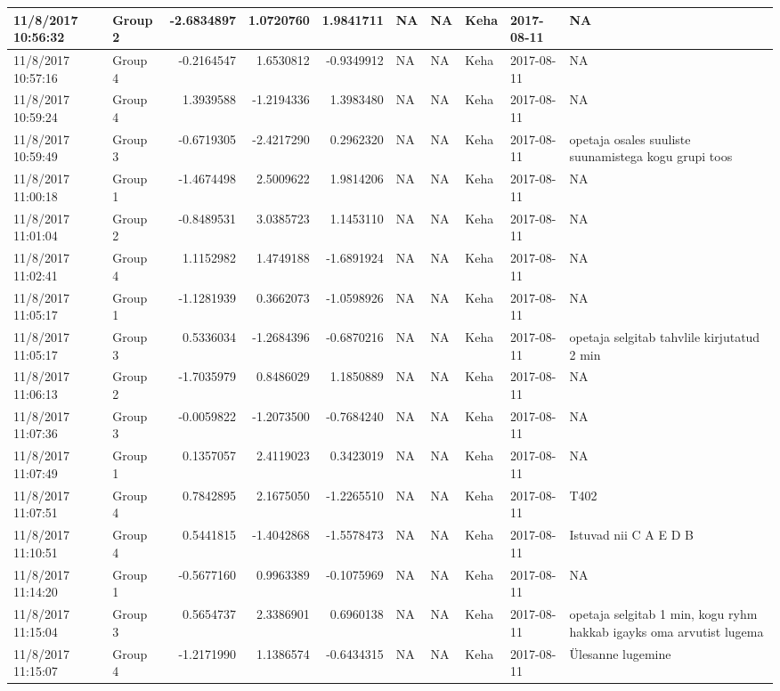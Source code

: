 \documentclass[]{article}
\begin{document}
\begin{tabular}{l|l|r|r|r|l|l|l|l|l}
\hline
11/8/2017 10:56:32 & Group 2 & -2.6834897 & 1.0720760 & 1.9841711 & NA & NA & Keha & 2017-08-11 & NA\\
\hline
11/8/2017 10:57:16 & Group 4 & -0.2164547 & 1.6530812 & -0.9349912 & NA & NA & Keha & 2017-08-11 & NA\\
\hline
11/8/2017 10:59:24 & Group 4 & 1.3939588 & -1.2194336 & 1.3983480 & NA & NA & Keha & 2017-08-11 & NA\\
\hline
11/8/2017 10:59:49 & Group 3 & -0.6719305 & -2.4217290 & 0.2962320 & NA & NA & Keha & 2017-08-11 & opetaja osales suuliste suunamistega kogu grupi toos\\
\hline
11/8/2017 11:00:18 & Group 1 & -1.4674498 & 2.5009622 & 1.9814206 & NA & NA & Keha & 2017-08-11 & NA\\
\hline
11/8/2017 11:01:04 & Group 2 & -0.8489531 & 3.0385723 & 1.1453110 & NA & NA & Keha & 2017-08-11 & NA\\
\hline
11/8/2017 11:02:41 & Group 4 & 1.1152982 & 1.4749188 & -1.6891924 & NA & NA & Keha & 2017-08-11 & NA\\
\hline
11/8/2017 11:05:17 & Group 1 & -1.1281939 & 0.3662073 & -1.0598926 & NA & NA & Keha & 2017-08-11 & NA\\
\hline
11/8/2017 11:05:17 & Group 3 & 0.5336034 & -1.2684396 & -0.6870216 & NA & NA & Keha & 2017-08-11 & opetaja selgitab tahvlile kirjutatud 2 min\\
\hline
11/8/2017 11:06:13 & Group 2 & -1.7035979 & 0.8486029 & 1.1850889 & NA & NA & Keha & 2017-08-11 & NA\\
\hline
11/8/2017 11:07:36 & Group 3 & -0.0059822 & -1.2073500 & -0.7684240 & NA & NA & Keha & 2017-08-11 & NA\\
\hline
11/8/2017 11:07:49 & Group 1 & 0.1357057 & 2.4119023 & 0.3423019 & NA & NA & Keha & 2017-08-11 & NA\\
\hline
11/8/2017 11:07:51 & Group 4 & 0.7842895 & 2.1675050 & -1.2265510 & NA & NA & Keha & 2017-08-11 & T402\\
\hline
11/8/2017 11:10:51 & Group 4 & 0.5441815 & -1.4042868 & -1.5578473 & NA & NA & Keha & 2017-08-11 & Istuvad nii C A E D B\\
\hline
11/8/2017 11:14:20 & Group 1 & -0.5677160 & 0.9963389 & -0.1075969 & NA & NA & Keha & 2017-08-11 & NA\\
\hline
11/8/2017 11:15:04 & Group 3 & 0.5654737 & 2.3386901 & 0.6960138 & NA & NA & Keha & 2017-08-11 & opetaja selgitab 1 min, kogu ryhm hakkab igayks oma arvutist lugema\\
\hline
11/8/2017 11:15:07 & Group 4 & -1.2171990 & 1.1386574 & -0.6434315 & NA & NA & Keha & 2017-08-11 & Ülesanne lugemine\\

\end{tabular}
\end{document}
